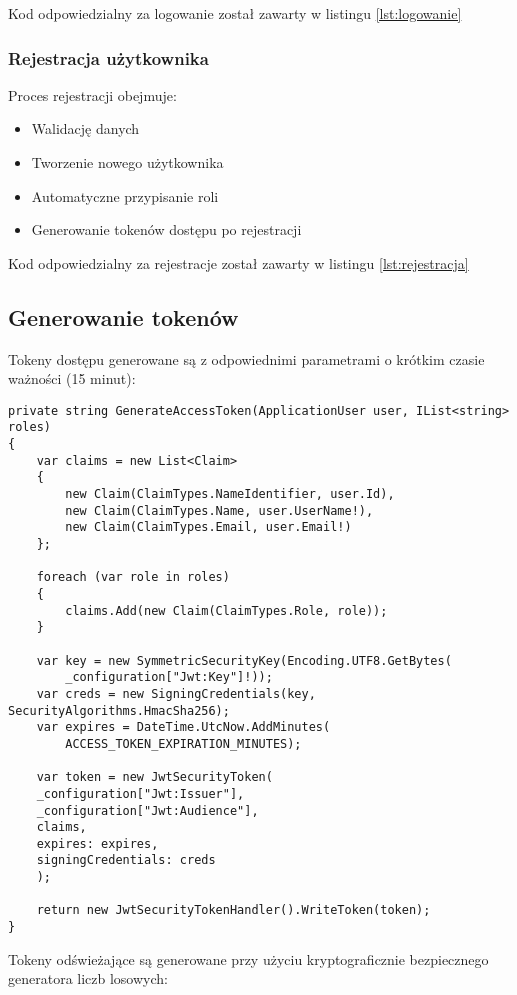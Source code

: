 Kod odpowiedzialny za logowanie został zawarty w listingu \ref{lst:logowanie}


\subsubsection{Rejestracja użytkownika}
Proces rejestracji obejmuje:
\begin{itemize}
	\item Walidację danych
	\item Tworzenie nowego użytkownika
	\item Automatyczne przypisanie roli
	\item Generowanie tokenów dostępu po rejestracji
\end{itemize}

Kod odpowiedzialny za rejestracje został zawarty w listingu \ref{lst:rejestracja}

\subsection{Generowanie tokenów}
Tokeny dostępu generowane są z odpowiednimi parametrami o krótkim czasie ważności (15 minut):

\begin{lstlisting}[style=csharp, caption={Generowanie tokenu JWT}]
private string GenerateAccessToken(ApplicationUser user, IList<string> roles)
{
	var claims = new List<Claim>
	{
		new Claim(ClaimTypes.NameIdentifier, user.Id),
		new Claim(ClaimTypes.Name, user.UserName!),
		new Claim(ClaimTypes.Email, user.Email!)
	};
	
	foreach (var role in roles)
	{
		claims.Add(new Claim(ClaimTypes.Role, role));
	}
	
	var key = new SymmetricSecurityKey(Encoding.UTF8.GetBytes(
		_configuration["Jwt:Key"]!));
	var creds = new SigningCredentials(key, SecurityAlgorithms.HmacSha256);
	var expires = DateTime.UtcNow.AddMinutes(
		ACCESS_TOKEN_EXPIRATION_MINUTES);
	
	var token = new JwtSecurityToken(
	_configuration["Jwt:Issuer"],
	_configuration["Jwt:Audience"],
	claims,
	expires: expires,
	signingCredentials: creds
	);
	
	return new JwtSecurityTokenHandler().WriteToken(token);
}
\end{lstlisting}

Tokeny odświeżające są generowane przy użyciu kryptograficznie bezpiecznego generatora liczb losowych:


